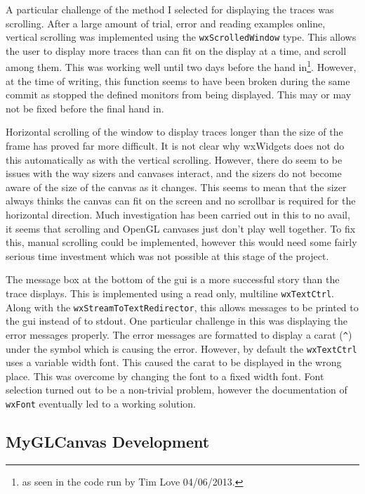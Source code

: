 \documentclass[a4paper,10pt]{article}  %
\begin{document}
A particular challenge of the method I selected for displaying the
traces was scrolling. After a large amount of trial, error and reading
examples online, vertical scrolling was implemented using the
\texttt{wxScrolledWindow} type. This allows the user to display more
traces than can fit on the display at a time, and scroll among
them. This was working well until two days before the hand
in\footnote{as seen in the code run by Tim Love 04/06/2013.}. However,
at the time of writing, this function seems to have been broken during
the same commit as stopped the defined monitors from being
displayed. This may or may not be fixed before the final hand in.

Horizontal scrolling of the window to display traces longer than the
size of the frame has proved far more difficult. It is not clear why
wxWidgets does not do this automatically as with the vertical
scrolling. However, there do seem to be issues with the way sizers and
canvases interact, and the sizers do not become aware of the size of
the canvas as it changes. This seems to mean that the sizer always
thinks the canvas can fit on the screen and no scrollbar is required
for the horizontal direction. Much investigation has been carried out
in this to no avail, it seems that scrolling and OpenGL canvases just
don't play well together. To fix this, manual scrolling could be
implemented, however this would need some fairly serious time
investment which was not possible at this stage of the project.

The message box at the bottom of the gui is a more successful story
than the trace displays. This is implemented using a read only,
multiline \texttt{wxTextCtrl}. Along with the
\texttt{wxStreamToTextRedirector}, this allows messages to be printed
to the gui instead of to stdout. One particular challenge in this was
displaying the error messages properly. The error messages are
formatted to display a carat (\verb+^+) under the symbol which is
causing the error. However, by default the \texttt{wxTextCtrl} uses a
variable width font. This caused the carat to be displayed in the
wrong place. This was overcome by changing the font to a fixed width
font. Font selection turned out to be a non-trivial problem, however
the documentation of \texttt{wxFont} eventually led to a working
solution.

\subsection{MyGLCanvas Development}
\end{document}
